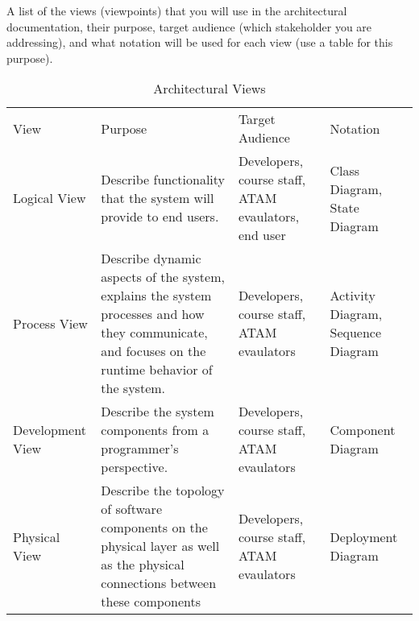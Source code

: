 A list of the views (viewpoints) that you will use in the architectural
documentation, their purpose, target audience (which stakeholder you are
addressing), and what notation will be used for each view (use a table for this purpose).

\begin{table}[ht]
	\centering
	\caption{Architectural Views}
	\label{viewSelection}
	\begin{tabularx}{\textwidth}{p{2cm}XXp{2cm}}
		View             & Purpose                                                                                                                                            & Target Audience                                     & Notation                           \\
		Logical View     & Describe functionality that the system will provide to end users.                                                                                  & Developers, course staff, ATAM evaulators, end user & Class Diagram, State Diagram       \\
		Process View     & Describe dynamic aspects of the system, explains the system processes and how they communicate, and focuses on the runtime behavior of the system. & Developers, course staff, ATAM evaulators           & Activity Diagram, Sequence Diagram \\
		Development View & Describe the system components from a programmer's perspective.                                                                                    & Developers, course staff, ATAM evaulators           & Component Diagram                  \\
		Physical View    & Describe the topology of software components on the physical layer as well as the physical connections between these components                    & Developers, course staff, ATAM evaulators           & Deployment Diagram
	\end{tabularx}
\end{table}
